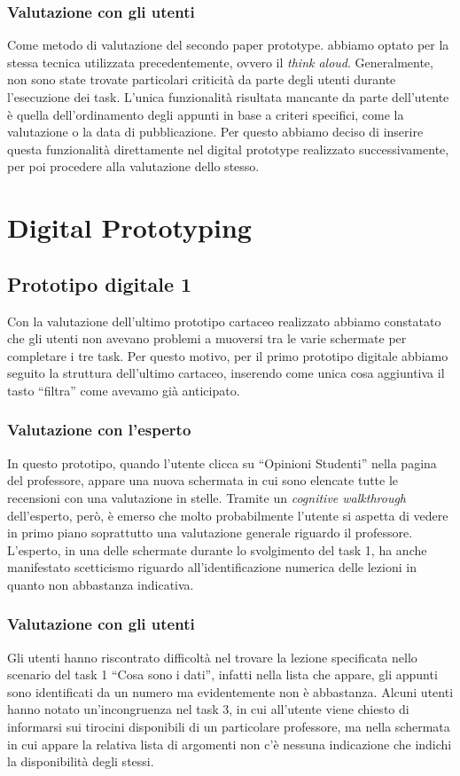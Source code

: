 \subsubsection{Valutazione con gli utenti}
Come metodo di valutazione del secondo paper prototype. abbiamo optato per la stessa tecnica utilizzata precedentemente, ovvero il \textit{think aloud}. Generalmente, non
sono state trovate particolari criticità da parte degli utenti durante l’esecuzione dei task. L’unica funzionalità risultata mancante da parte dell’utente è quella
dell’ordinamento degli appunti in base a criteri specifici, come la valutazione o la data di pubblicazione. Per questo
abbiamo deciso di inserire questa funzionalità direttamente nel digital prototype realizzato successivamente, per poi procedere alla valutazione dello stesso.

\section{Digital Prototyping}

\subsection{Prototipo digitale 1}
Con la valutazione dell'ultimo prototipo cartaceo realizzato abbiamo constatato che gli utenti non avevano problemi a muoversi tra le varie schermate per completare i tre task. Per questo motivo, per il
primo prototipo digitale abbiamo seguito la struttura dell’ultimo cartaceo, inserendo come unica cosa aggiuntiva il tasto “filtra” come avevamo già anticipato.

\subsubsection{Valutazione con l'esperto}
In questo prototipo, quando l’utente clicca su “Opinioni Studenti” nella pagina del professore, appare una nuova schermata in cui sono elencate tutte le recensioni con una valutazione in stelle.
Tramite un \textit{cognitive walkthrough} dell’esperto, però, è emerso che molto probabilmente l’utente si aspetta di vedere in primo piano soprattutto una valutazione generale riguardo il professore.
L’esperto, in una delle schermate durante lo svolgimento del task 1, ha anche manifestato scetticismo riguardo all’identificazione numerica delle lezioni in quanto non abbastanza indicativa.

\subsubsection{Valutazione con gli utenti}
Gli utenti hanno riscontrato difficoltà nel trovare la lezione specificata nello scenario del task 1 “Cosa sono i dati”, infatti nella lista che appare, gli appunti sono identificati da un numero
ma evidentemente non è abbastanza.
Alcuni utenti hanno notato un’incongruenza nel task 3, in cui all’utente viene chiesto di informarsi sui tirocini disponibili di un particolare professore, ma nella schermata in cui appare la relativa
lista di argomenti non c’è nessuna indicazione che indichi la disponibilità degli stessi.

